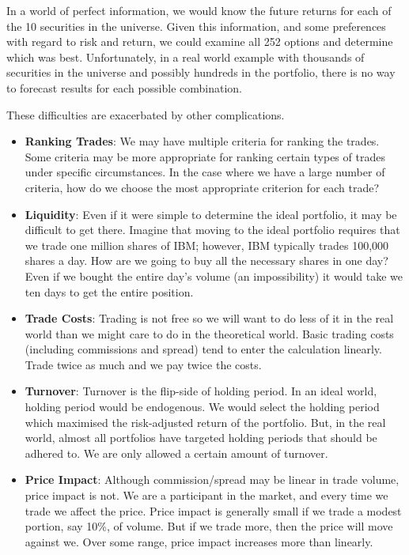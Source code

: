 \documentclass{article}
\begin{document}
In a world of perfect information, we would know the future
returns for each of the 10 securities in the universe. Given this
information, and some preferences with regard to risk and return, we
could examine all 252 options and determine which was best.
Unfortunately, in a real world example with thousands of securities in
the universe and possibly hundreds in the portfolio, there is no way
to forecast results for each possible combination.

These difficulties are exacerbated by other complications.

\begin{itemize}

\item{\bf{Ranking Trades}}: We may have multiple criteria for ranking
  the trades.  Some criteria may be more appropriate for ranking
  certain types of trades under specific circumstances.  In the case
  where we have a large number of criteria, how do we choose the most
  appropriate criterion for each trade?

\item{\bf{Liquidity}}: Even if it were simple to determine the ideal
  portfolio, it may be difficult to get there. Imagine that moving to
  the ideal portfolio requires that we trade one million shares of
  IBM; however, IBM typically trades 100,000 shares a day. How are we
  going to buy all the necessary shares in one day? Even if we bought
  the entire day's volume (an impossibility) it would take we ten days
  to get the entire position.

\item{\bf{Trade Costs}}: Trading is not free so we will want to do less of
  it in the real world than we might care to do in the theoretical
  world. Basic trading costs (including commissions and spread) tend
  to enter the calculation linearly. Trade twice as much and we pay
  twice the costs. 

\item{\bf{Turnover}}: Turnover is the flip-side of holding period.  In an
  ideal world, holding period would be endogenous. We would select
  the holding period which maximised the risk-adjusted return of the
  portfolio. But, in the real world, almost all portfolios have
  targeted holding periods that should be adhered to. We are only
  allowed a certain amount of turnover.

\item{\bf{Price Impact}}: Although commission/spread may be linear in
  trade volume, price impact is not.  We are a participant in the
  market, and every time we trade we affect the price.  Price impact
  is generally small if we trade a modest portion, say 10\%, of
  volume.  But if we trade more, then the price will move against
  we.  Over some range, price impact increases more than linearly.
 
\end{itemize}
\end{document}
